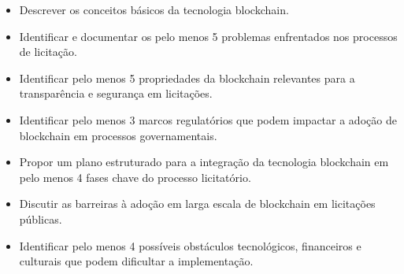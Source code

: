 \begin{itemize}
\item Descrever os conceitos básicos da tecnologia blockchain.
\item Identificar e documentar os pelo menos 5 problemas enfrentados nos processos de licitação.
\item Identificar pelo menos 5 propriedades da blockchain relevantes para a transparência e segurança em licitações.
\item Identificar pelo menos 3 marcos regulatórios  que podem impactar a adoção de blockchain em processos governamentais.
\item Propor um plano estruturado para a integração da tecnologia blockchain em pelo menos 4 fases chave  do processo licitatório.
\item Discutir as barreiras à adoção em larga escala de blockchain em licitações públicas.
\item  Identificar pelo menos 4  possíveis  obstáculos tecnológicos, financeiros e culturais que podem dificultar a implementação.
\end{itemize}
